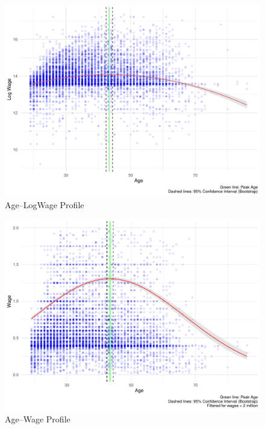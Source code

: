 \documentclass[11pt,a4paper,onecolumn]{article}
\begin{document}
    \begin{figure}[H]
        \includegraphics[scale=0.6]{../views/P1_age_log_wage_profile.pdf}   
        \caption{Age--LogWage Profile} \label{fig:P1}
    \end{figure}
    
    \begin{figure}[H]
        \includegraphics[scale=0.6]{../views/P2_age_wage_profile.pdf}   
        \caption{Age--Wage Profile } \label{fig:P2}
    \end{figure}
    
\end{document}
